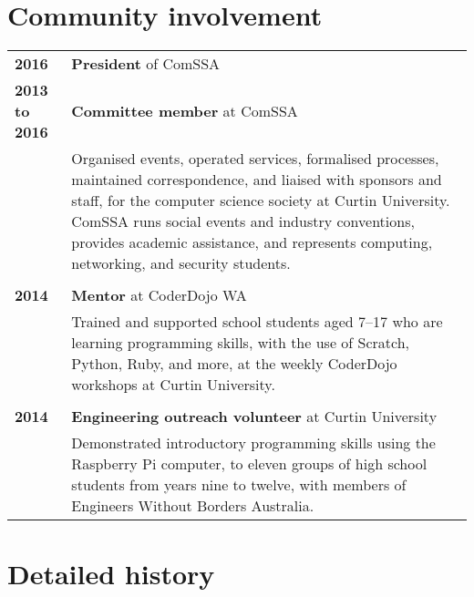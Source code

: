 \documentclass[a4paper,12pt]{article}
\begin{document}
\section*{Community involvement}

\begin{tabular}{p{35mm}p{125mm}}
	                    \textbf{2016}               & \textbf{President} of ComSSA
	\vspace{0.2em}  \\  \textbf{2013 to 2016}       & \textbf{Committee member} at ComSSA
	\vspace{0.2em}  \\                              & Organised events, operated services, formalised processes, maintained correspondence, and liaised with sponsors and staff, for the computer science society at Curtin University. ComSSA runs social events and industry conventions, provides academic assistance, and represents computing, networking, and security students.
	\\              \\  \textbf{2014}               & \textbf{Mentor} at CoderDojo WA
	\vspace{0.2em}  \\                              & Trained and supported school students aged 7--17 who are learning programming skills, with the use of Scratch, Python, Ruby, and more, at the weekly CoderDojo workshops at Curtin University.
	\\              \\  \textbf{2014}               & \textbf{Engineering outreach volunteer} at Curtin University
	\vspace{0.2em}  \\                              & Demonstrated introductory programming skills using the Raspberry Pi computer, to eleven groups of high school students from years nine to twelve, with members of Engineers Without Borders Australia.
\end{tabular}

\section*{Detailed history}
\end{document}
